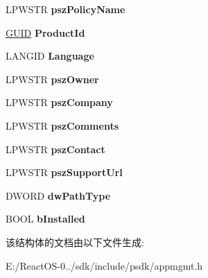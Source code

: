 \begin{DoxyCompactItemize}
L\+P\+W\+S\+TR {\bfseries psz\+Policy\+Name}
\item 
\mbox{\label{struct___m_a_n_a_g_e_d_a_p_p_l_i_c_a_t_i_o_n_a1e4374e8c9db239d6e6791ba2224e5e7}} 
\hyperlink{interface_g_u_i_d}{G\+U\+ID} {\bfseries Product\+Id}
\item 
\mbox{\label{struct___m_a_n_a_g_e_d_a_p_p_l_i_c_a_t_i_o_n_a9b4110e1f0b82e5c7738d9c19a0161a3}} 
L\+A\+N\+G\+ID {\bfseries Language}
\item 
\mbox{\label{struct___m_a_n_a_g_e_d_a_p_p_l_i_c_a_t_i_o_n_a35055faa9c4cf1b9791fd8214d92b411}} 
L\+P\+W\+S\+TR {\bfseries psz\+Owner}
\item 
\mbox{\label{struct___m_a_n_a_g_e_d_a_p_p_l_i_c_a_t_i_o_n_a9053c33fd3086ce6b0306088cd10fe74}} 
L\+P\+W\+S\+TR {\bfseries psz\+Company}
\item 
\mbox{\label{struct___m_a_n_a_g_e_d_a_p_p_l_i_c_a_t_i_o_n_a9054434f1433785a933a9bf1baee06c2}} 
L\+P\+W\+S\+TR {\bfseries psz\+Comments}
\item 
\mbox{\label{struct___m_a_n_a_g_e_d_a_p_p_l_i_c_a_t_i_o_n_aa5a02dc4075cc9638a4064b8644c0c02}} 
L\+P\+W\+S\+TR {\bfseries psz\+Contact}
\item 
\mbox{\label{struct___m_a_n_a_g_e_d_a_p_p_l_i_c_a_t_i_o_n_a6ae7d6da6b087a4369699a6ef20e398f}} 
L\+P\+W\+S\+TR {\bfseries psz\+Support\+Url}
\item 
\mbox{\label{struct___m_a_n_a_g_e_d_a_p_p_l_i_c_a_t_i_o_n_a767ce5d3af974c7c78e3ea6441ce1519}} 
D\+W\+O\+RD {\bfseries dw\+Path\+Type}
\item 
\mbox{\label{struct___m_a_n_a_g_e_d_a_p_p_l_i_c_a_t_i_o_n_a8fc0e4c5f1ac8c9d2b941bde5be8890a}} 
B\+O\+OL {\bfseries b\+Installed}
\end{DoxyCompactItemize}


该结构体的文档由以下文件生成\+:\begin{DoxyCompactItemize}
\item 
E\+:/\+React\+O\+S-\/0../sdk/include/psdk/appmgmt.\+h\end{DoxyCompactItemize}
